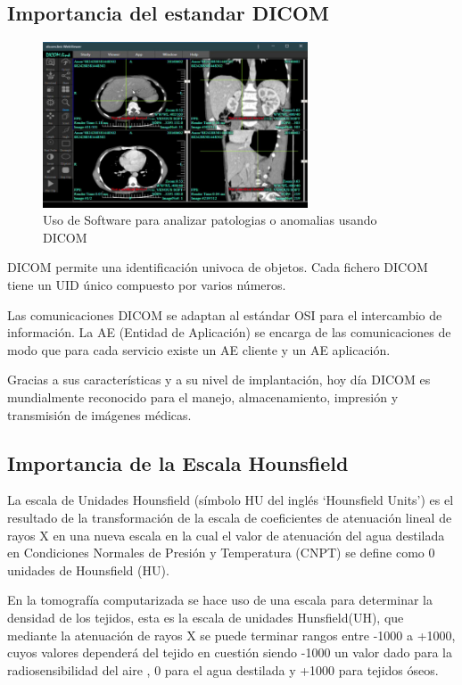 \documentclass{article}
\begin{document}
\subsection{Importancia del estandar DICOM}

\begin{figure}[H]
\centering
\includegraphics[width=0.7\textwidth]{img/dicom_real.jpg}
\caption{Uso de Software para analizar patologias o anomalias usando DICOM}
\end{figure}

DICOM permite una identificación univoca de objetos. Cada fichero DICOM tiene un UID único compuesto por varios números.

Las comunicaciones DICOM se adaptan al estándar OSI para el intercambio de información. La AE (Entidad de Aplicación) se encarga de las comunicaciones de modo que para cada servicio existe un AE cliente y un AE aplicación.

Gracias a sus características y a su nivel de implantación, hoy día DICOM es mundialmente reconocido para el manejo, almacenamiento, impresión y transmisión de imágenes médicas.

\subsection{Importancia de la Escala Hounsfield}
La escala de Unidades Hounsfield (símbolo HU del inglés ‘Hounsfield Units’) es el resultado de la transformación de la escala de coeficientes de atenuación lineal de rayos X en una nueva escala en la cual el valor de atenuación del agua destilada en Condiciones Normales de Presión y Temperatura (CNPT) se define como 0 unidades de Hounsfield (HU).

En la tomografía computarizada se hace uso de una escala para determinar la densidad de los
tejidos, esta es la escala de unidades Hunsfield(UH), que mediante la atenuación de rayos X se
puede terminar rangos entre -1000 a +1000, cuyos valores dependerá del tejido en cuestión siendo
-1000 un valor dado para la radiosensibilidad del aire , 0 para el agua destilada y +1000 para
tejidos óseos.
\end{document}
